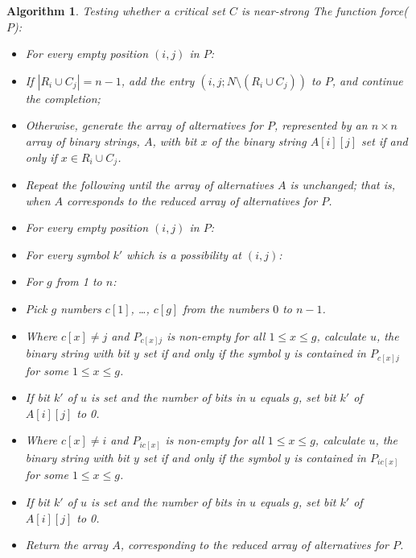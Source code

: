 \documentclass[12pt]{report}
\newtheorem{algorithm}{Algorithm}
\begin{document}
\begin{algorithm}{Testing whether a critical set $C$ is near-strong}
The function force($P$):
\begin{itemize}
\item For every empty position $(i,j)$ in $P$:
\item[-] If $|R_i \cup C_j| = n-1$, add the entry $(i,j;N \setminus (R_i 
\cup C_j))$ to $P$, and continue the completion;
\item[-] Otherwise, generate the array of alternatives for $P$, represented by an $n \times n$ array of binary strings, $A$, with bit $x$ of the binary string $A[i][j]$ set if and only if $x \in R_i \cup C_j$.
\item Repeat the following until the array of alternatives $A$ is unchanged; that is, when $A$ corresponds to the reduced array of alternatives for $P$.
\item[-] For every empty position $(i,j)$ in $P$:
\item[-] For every symbol $k'$ which is a possibility at $(i,j)$: 
\item[-] For $g$ from 1 to $n$:
\item[-] Pick $g$ numbers $c[1]$, \dots, $c[g]$ from the numbers $0$ to $n-1$.
\item[-] Where $c[x] \neq j$ and $P_{c[x]j}$ is non-empty for all $1 \leq x \leq g$, calculate $u$, the binary string with bit $y$ set if and only if the symbol $y$ is contained in $P_{c[x]j}$ for some $1 \leq x \leq g$.
\item[-] If bit $k'$ of $u$ is set and the number of bits in $u$ equals $g$, set bit $k'$ of $A[i][j]$ to 0.
\item[-] Where $c[x] \neq i$ and $P_{ic[x]}$ is non-empty for all $1 \leq x \leq g$, calculate $u$, the binary string with bit $y$ set if and only if the symbol $y$ is contained in $P_{ic[x]}$ for some $1 \leq x \leq g$.
\item[-] If bit $k'$ of $u$ is set and the number of bits in $u$ equals $g$, set bit $k'$ of $A[i][j]$ to 0.
\item Return the array $A$, corresponding to the reduced array of alternatives for $P$.
\end{itemize}
\end{algorithm}
\end{document}

